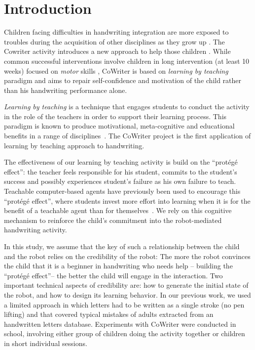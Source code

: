 \documentclass{sig-alternate}
\begin{document}

\section{Introduction}

Children facing difficulties in handwriting integration are more exposed
to troubles during the acquisition of other disciplines as they grow up
\cite{Christensen2005}. 
The Cowriter activity introduces a new approach to help those children
\cite{Hood}. While common successful interventions involve children
in long intervention (at least 10 weeks) focused on \emph{motor} skills \cite{Hoy2011},
CoWriter is based on \emph{learning by teaching} paradigm and aims to repair
self-confidence and motivation of the child rather than his handwriting performance alone.

\emph{Learning by teaching} is a technique that engages students to conduct the activity in the role of the teachers in order to support their learning process. This 
paradigm is known to produce motivational, meta-cognitive and educational
benefits in a range of disciplines~\cite{Rohrbeck2003}. The CoWriter project
is the first application of learning by teaching approach to handwriting. 

The effectiveness of our learning by teaching activity is build on the
``prot\'eg\'e effect'': the teacher feels responsible for his student, commits
to the student's success and possibly experiences student's failure as his own
failure to teach. Teachable computer-based agents have previously been used to
encourage this ``prot\'eg\'e effect'', where students invest more effort into
learning when it is for the benefit of a teachable agent than for themselves~\cite{Chase2009}.
We rely on this cognitive mechanism to reinforce the child's commitment into the
robot-mediated handwriting activity.

In this study, we assume that the key of such a relationship between the child
and the robot relies on the credibility of the robot:
The more the robot convinces the child that it is a beginner in
handwriting who needs help -- building the ``prot\'eg\'e effect''-- the better
the child will engage in the interaction. Two important technical aspects of
credibility are: how to generate the initial state of the robot, and how to design its
learning behavior. In our previous work, we used a limited approach in which
letters had to be written as a single stroke (no pen lifting) and that covered
typical mistakes of adults extracted from an handwritten letters database. Experiments with CoWriter were conducted in school, involving either group of
children doing the activity together or children
in short individual sessions.
\end{document}
